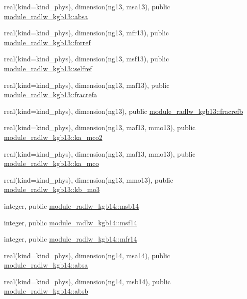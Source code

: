 \begin{DoxyCompactItemize}
real(kind=kind\+\_\+phys), dimension(ng13, msa13), public \hyperlink{group__module__radlw__main_ga22ce8d48ac3dceae1d52e80097fc2689}{module\+\_\+radlw\+\_\+kgb13\+::absa}
\item 
real(kind=kind\+\_\+phys), dimension(ng13, mfr13), public \hyperlink{group__module__radlw__main_ga93c6546ef5f8cbfc4f63de29e1ba2452}{module\+\_\+radlw\+\_\+kgb13\+::forref}
\item 
real(kind=kind\+\_\+phys), dimension(ng13, msf13), public \hyperlink{group__module__radlw__main_gac8f58bba6aa4b72ffd01f78e60d0831f}{module\+\_\+radlw\+\_\+kgb13\+::selfref}
\item 
real(kind=kind\+\_\+phys), dimension(ng13, maf13), public \hyperlink{group__module__radlw__main_ga82aed8a05cd528b287e336f7ff8fcebb}{module\+\_\+radlw\+\_\+kgb13\+::fracrefa}
\item 
real(kind=kind\+\_\+phys), dimension(ng13), public \hyperlink{group__module__radlw__main_ga92d45aee9dab62549ea8821eae7422dd}{module\+\_\+radlw\+\_\+kgb13\+::fracrefb}
\item 
real(kind=kind\+\_\+phys), dimension(ng13, maf13, mmo13), public \hyperlink{group__module__radlw__main_ga523a0bc861ea861869f59b7bd007ff50}{module\+\_\+radlw\+\_\+kgb13\+::ka\+\_\+mco2}
\item 
real(kind=kind\+\_\+phys), dimension(ng13, maf13, mmo13), public \hyperlink{group__module__radlw__main_ga0c2f5802f9471c35759cb673dbc8ca05}{module\+\_\+radlw\+\_\+kgb13\+::ka\+\_\+mco}
\item 
real(kind=kind\+\_\+phys), dimension(ng13, mmo13), public \hyperlink{group__module__radlw__main_gacc93fbdd9ce1062cbe9b01973d8ab229}{module\+\_\+radlw\+\_\+kgb13\+::kb\+\_\+mo3}
\item 
integer, public \hyperlink{group__module__radlw__main_ga2d400a2aa969f2b2b6efd15555b67159}{module\+\_\+radlw\+\_\+kgb14\+::msb14}
\item 
integer, public \hyperlink{group__module__radlw__main_ga37c15d52e45cd6b36dc246a059b0c5ca}{module\+\_\+radlw\+\_\+kgb14\+::msf14}
\item 
integer, public \hyperlink{group__module__radlw__main_ga52354badbce95c005b19bd5a443fd488}{module\+\_\+radlw\+\_\+kgb14\+::mfr14}
\item 
real(kind=kind\+\_\+phys), dimension(ng14, msa14), public \hyperlink{group__module__radlw__main_gab57cb029ede27280bc99641f39ab3a81}{module\+\_\+radlw\+\_\+kgb14\+::absa}
\item 
real(kind=kind\+\_\+phys), dimension(ng14, msb14), public \hyperlink{group__module__radlw__main_gaa7a122319c49f3c1e8d51d21771cb63d}{module\+\_\+radlw\+\_\+kgb14\+::absb}

\end{DoxyCompactItemize}
